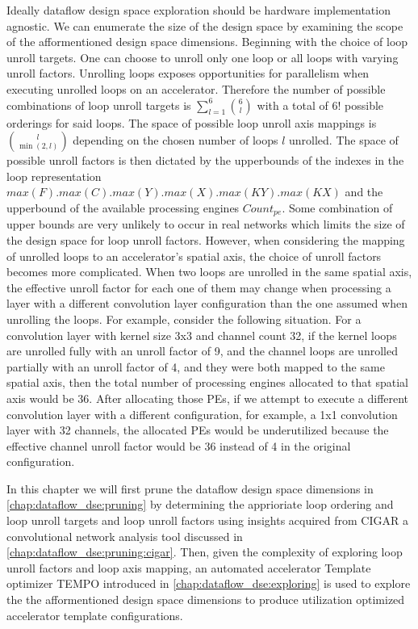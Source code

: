 Ideally dataflow design space exploration should be hardware implementation
agnostic. We can enumerate the size of the design space by examining the scope
of the afformentioned design space dimensions. Beginning with the choice of loop
unroll targets. One can choose to unroll only one loop or all loops with
varying unroll factors. Unrolling loops exposes opportunities for parallelism
when executing unrolled loops on an accelerator. Therefore the number of
possible combinations of loop unroll targets is
$\sum\limits_{l=1}^{6}\binom{6}{l}$ with a total of $6!$ possible orderings for
said loops. The space of possible loop unroll axis mappings is $\binom{l}{\min(2,
l)}$ depending on the chosen number of loops $l$ unrolled. The space of possible
unroll factors is then dictated by the upperbounds of the indexes in the loop
representation $max(F).max(C).max(Y).max(X).max(KY).max(KX)$ and the upperbound
of the available processing engines $Count_{pe}$. Some combination of upper
bounds are very unlikely to occur in real networks which limits the size of the
design space for loop unroll factors. However, when considering the
mapping of unrolled loops to an accelerator's spatial axis, the choice of unroll
factors becomes more complicated. When two loops are unrolled in the same
spatial axis, the effective unroll factor for each one of them may change when
processing a layer with a different convolution layer configuration than the one
assumed when unrolling the loops. For example, consider the following situation.
For a convolution layer with kernel size 3x3 and channel count 32, if the kernel
loops are unrolled fully with an unroll factor of 9, and the channel loops are
unrolled partially with an unroll factor of 4, and they were both mapped to the
same spatial axis, then the total number of processing engines allocated to that
spatial axis would be 36. After allocating those PEs, if we attempt to execute a
different convolution layer with a different configuration, for example, a 1x1
convolution layer with 32 channels, the allocated PEs would be underutilized because
the effective channel unroll factor would be 36 instead of 4 in the original
configuration.

In this chapter we will first prune the dataflow design space dimensions in
\autoref{chap:dataflow_dse:pruning} by determining the apprioriate loop ordering
and loop unroll targets and loop unroll factors using insights acquired from
\ac{CIGAR} a convolutional network analysis tool discussed in
\autoref{chap:dataflow_dse:pruning:cigar}. Then, given the complexity of
exploring loop unroll factors and loop axis mapping, an automated accelerator
Template optimizer TEMPO introduced in \autoref{chap:dataflow_dse:exploring} is
used to explore the the afformentioned design space dimensions to produce
utilization optimized accelerator template configurations. 

